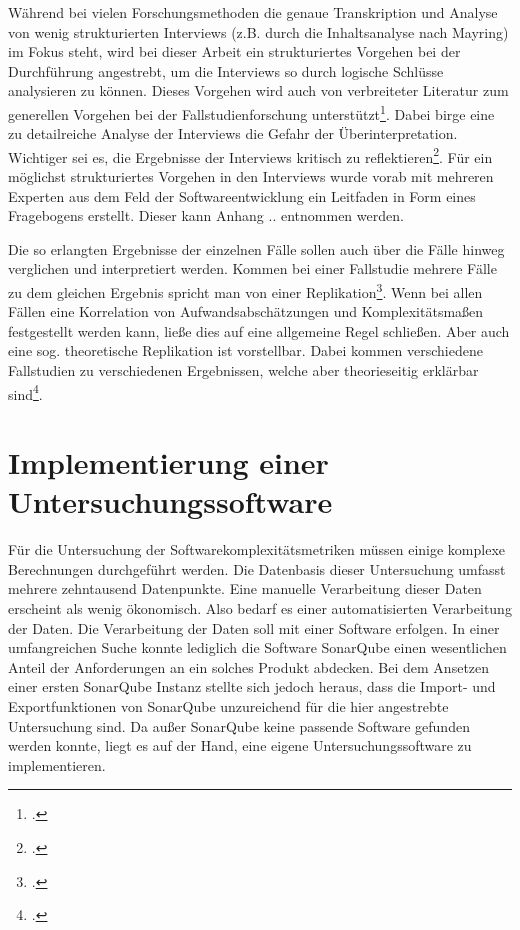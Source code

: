 Während bei vielen Forschungsmethoden die genaue Transkription und
Analyse von wenig strukturierten Interviews (z.B. durch die
Inhaltsanalyse nach Mayring) im Fokus steht, wird bei dieser Arbeit ein
strukturiertes Vorgehen bei der Durchführung angestrebt, um die
Interviews so durch logische Schlüsse analysieren zu können. Dieses
Vorgehen wird auch von verbreiteter Literatur zum generellen Vorgehen
bei der Fallstudienforschung unterstützt\footcite[][S. 12]{gothlichFallstudienAlsForschungsmethode2003}. Dabei birge eine zu
detailreiche Analyse der Interviews die Gefahr der Überinterpretation.
Wichtiger sei es, die Ergebnisse der Interviews kritisch zu reflektieren\footcite[][S. 12]{gothlichFallstudienAlsForschungsmethode2003}. Für ein möglichst
strukturiertes Vorgehen in den Interviews wurde vorab mit mehreren
Experten aus dem Feld der Softwareentwicklung ein Leitfaden in Form
eines Fragebogens erstellt. Dieser kann Anhang .. entnommen werden.

Die so erlangten Ergebnisse der einzelnen Fälle sollen auch über die
Fälle hinweg verglichen und interpretiert werden. Kommen bei einer
Fallstudie mehrere Fälle zu dem gleichen Ergebnis spricht man von einer
Replikation\footcite[Vgl. [S. 11]{gothlichFallstudienAlsForschungsmethode2003}. Wenn
bei allen Fällen eine Korrelation von Aufwandsabschätzungen und
Komplexitätsma\ss en festgestellt werden kann, lie\ss e dies auf eine
allgemeine Regel schlie\ss en. Aber auch eine sog. theoretische Replikation
ist vorstellbar. Dabei kommen verschiedene Fallstudien zu verschiedenen
Ergebnissen, welche aber theorieseitig erklärbar sind\footcite[][S. 11]{gothlichFallstudienAlsForschungsmethode2003}.

\section{Implementierung einer
Untersuchungssoftware}\label{implementierung-einer-untersuchungssoftware}

Für die Untersuchung der Softwarekomplexitätsmetriken müssen einige
komplexe Berechnungen durchgeführt werden. Die Datenbasis dieser
Untersuchung umfasst mehrere zehntausend Datenpunkte. Eine manuelle
Verarbeitung dieser Daten erscheint als wenig ökonomisch. Also bedarf es
einer automatisierten Verarbeitung der Daten. Die Verarbeitung der Daten
soll mit einer Software erfolgen. In einer umfangreichen Suche konnte
lediglich die Software SonarQube einen wesentlichen Anteil der
Anforderungen an ein solches Produkt abdecken. Bei dem Ansetzen einer
ersten SonarQube Instanz stellte sich jedoch heraus, dass die Import-
und Exportfunktionen von SonarQube unzureichend für die hier angestrebte
Untersuchung sind. Da au\ss er SonarQube keine passende Software gefunden
werden konnte, liegt es auf der Hand, eine eigene Untersuchungssoftware
zu implementieren.

